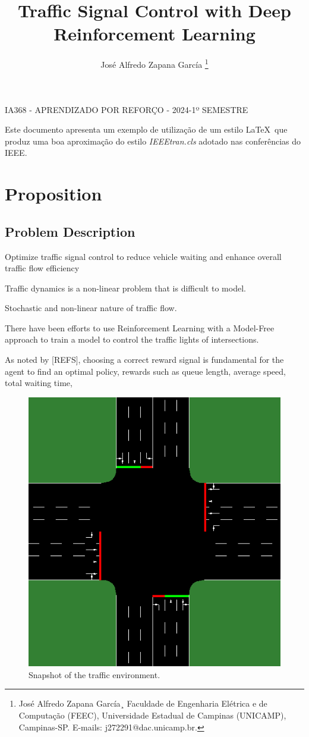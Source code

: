 \documentclass{Supervised_Reinforcement_Learningqsport}
\begin{document}
\title{Traffic Signal Control with Deep Reinforcement Learning}

\author{José Alfredo Zapana García
\thanks{José Alfredo Zapana García¸
Faculdade de Engenharia Elétrica e de Computação (FEEC), Universidade Estadual de Campinas (UNICAMP), Campinas-SP. E-mails: j272291@dac.unicamp.br.}}

\maketitle

 {IA368 - APRENDIZADO POR REFORÇO - 2024-1º SEMESTRE}

\begin{resumo}
Este documento apresenta um exemplo de utilização de um estilo \LaTeX\ que produz uma boa aproximação do estilo \textit{IEEEtran.cls} adotado nas conferências do IEEE.
\end{resumo}

\section{Proposition}

\subsection{Problem Description}

Optimize traffic signal control to reduce vehicle waiting and enhance overall traffic flow efficiency

Traffic dynamics is a non-linear problem that is difficult to model.

Stochastic and non-linear nature of traffic flow. 

There have been efforts to use Reinforcement Learning with a Model-Free approach to train a model to control the traffic lights of intersections.

As noted by [REFS], choosing a correct reward signal is fundamental for the agent to find an optimal policy, rewards such as queue length, average speed, total waiting time, 

\begin{figure}[htbp]
   \centerline{\includegraphics[width=0.6\columnwidth]{snap_envSUMO.png}}
    \caption{Snapshot of the traffic environment.}
    \label{fig:snap}
\end{figure}
\end{document}
